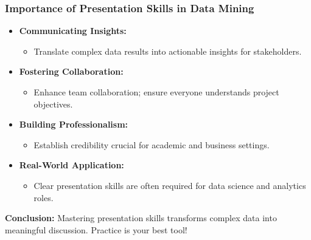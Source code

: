 \documentclass[aspectratio=169]{beamer}
\begin{document}
\begin{frame}[fragile]
    \frametitle{Importance of Presentation Skills in Data Mining}
    
    \begin{itemize}
        \item \textbf{Communicating Insights:}
            \begin{itemize}
                \item Translate complex data results into actionable insights for stakeholders.
            \end{itemize}
        
        \item \textbf{Fostering Collaboration:}
            \begin{itemize}
                \item Enhance team collaboration; ensure everyone understands project objectives.
            \end{itemize}
        
        \item \textbf{Building Professionalism:}
            \begin{itemize}
                \item Establish credibility crucial for academic and business settings.
            \end{itemize}
            
        \item \textbf{Real-World Application:}
            \begin{itemize}
                \item Clear presentation skills are often required for data science and analytics roles.
            \end{itemize}
    \end{itemize}
    
    \textbf{Conclusion:} Mastering presentation skills transforms complex data into meaningful discussion. Practice is your best tool!
\end{frame}
\end{document}
